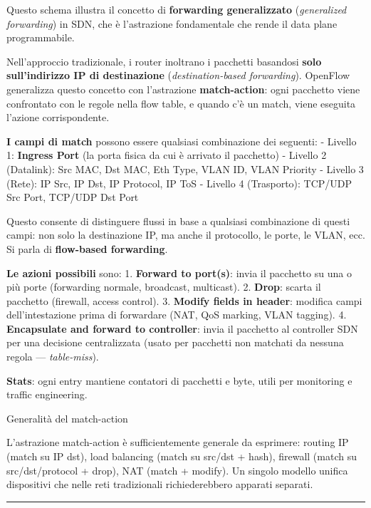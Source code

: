\documentclass[
  italian,
  openany]{book}
\begin{document}
Questo schema illustra il concetto di \textbf{forwarding generalizzato}
(\emph{generalized forwarding}) in SDN, che è l'astrazione fondamentale
che rende il data plane programmabile.

Nell'approccio tradizionale, i router inoltrano i pacchetti basandosi
\textbf{solo sull'indirizzo IP di destinazione} (\emph{destination-based
forwarding}). OpenFlow generalizza questo concetto con l'astrazione
\textbf{match-action}: ogni pacchetto viene confrontato con le regole
nella flow table, e quando c'è un match, viene eseguita l'azione
corrispondente.

\textbf{I campi di match} possono essere qualsiasi combinazione dei
seguenti: - Livello 1: \textbf{Ingress Port} (la porta fisica da cui è
arrivato il pacchetto) - Livello 2 (Datalink): Src MAC, Dst MAC, Eth
Type, VLAN ID, VLAN Priority - Livello 3 (Rete): IP Src, IP Dst, IP
Protocol, IP ToS - Livello 4 (Trasporto): TCP/UDP Src Port, TCP/UDP Dst
Port

Questo consente di distinguere flussi in base a qualsiasi combinazione
di questi campi: non solo la destinazione IP, ma anche il protocollo, le
porte, le VLAN, ecc. Si parla di \textbf{flow-based forwarding}.

\textbf{Le azioni possibili} sono: 1. \textbf{Forward to port(s)}: invia
il pacchetto su una o più porte (forwarding normale, broadcast,
multicast). 2. \textbf{Drop}: scarta il pacchetto (firewall, access
control). 3. \textbf{Modify fields in header}: modifica campi
dell'intestazione prima di forwardare (NAT, QoS marking, VLAN tagging).
4. \textbf{Encapsulate and forward to controller}: invia il pacchetto al
controller SDN per una decisione centralizzata (usato per pacchetti non
matchati da nessuna regola --- \emph{table-miss}).

\textbf{Stats}: ogni entry mantiene contatori di pacchetti e byte, utili
per monitoring e traffic engineering.

\begin{callouttip}{Generalità del match-action}

L'astrazione match-action è sufficientemente generale da esprimere:
routing IP (match su IP dst), load balancing (match su src/dst + hash),
firewall (match su src/dst/protocol + drop), NAT (match + modify). Un
singolo modello unifica dispositivi che nelle reti tradizionali
richiederebbero apparati separati.

\end{callouttip}

\begin{center}\rule{0.5\linewidth}{0.5pt}\end{center}
\end{document}
